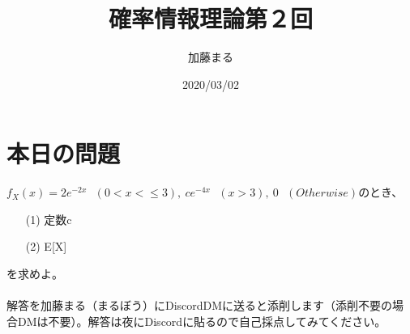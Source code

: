 \documentclass[a4j,uplatex]{jsarticle}
\title{確率情報理論第２回}
\author{加藤まる}
\date{2020/03/02}
\begin{document}
\maketitle

\section*{本日の問題}
$f_X(x)=2e^{-2x}~~~(0<x<\le 3),~ce^{-4x}~~~(x>3),~0~~~(Otherwise)$のとき、
\begin{itemize}
  \item[(1)] 定数c
  \item[(2)] E[X]  
\end{itemize}
を求めよ。
\\
\\
解答を加藤まる（まるぼう）にDiscordDMに送ると添削します（添削不要の場合DMは不要）。解答は夜にDiscordに貼るので自己採点してみてください。
\end{document}
